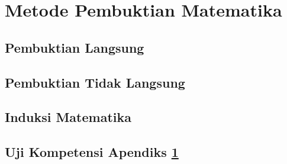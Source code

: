 \chapter{Metode Pembuktian Matematika}
\label{sec:second-app}
\kant[25-29] %
\section{Pembuktian Langsung}
\kant[16]
\section{Pembuktian Tidak Langsung}
\kant[17]
\section{Induksi Matematika}
\kant[18]
\section{Uji Kompetensi Apendiks \ref{sec:second-app}}
\kant[15]